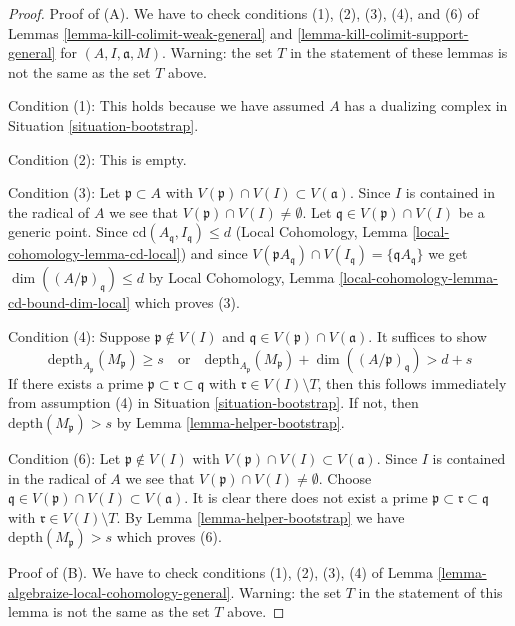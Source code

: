 \begin{proof}
\medskip\noindent
Proof of (A). We have to check conditions (1), (2), (3), (4), and (6)
of Lemmas \ref{lemma-kill-colimit-weak-general} and
\ref{lemma-kill-colimit-support-general} for
$(A, I, \mathfrak a, M)$. Warning: the set $T$ in the statement of
these lemmas is not the same as the set $T$ above.

\medskip\noindent
Condition (1): This holds because we have assumed $A$ has a dualizing complex in
Situation \ref{situation-bootstrap}.

\medskip\noindent
Condition (2): This is empty.

\medskip\noindent
Condition (3): Let $\mathfrak p \subset A$ with
$V(\mathfrak p) \cap V(I) \subset V(\mathfrak a)$.
Since $I$ is contained in the radical of $A$ we see
that $V(\mathfrak p) \cap V(I) \not = \emptyset$.
Let $\mathfrak q \in V(\mathfrak p) \cap V(I)$ be a generic point.
Since $\text{cd}(A_\mathfrak q, I_\mathfrak q) \leq d$
(Local Cohomology, Lemma \ref{local-cohomology-lemma-cd-local}) and since
$V(\mathfrak p A_\mathfrak q) \cap V(I_\mathfrak q) =
\{\mathfrak q A_\mathfrak q\}$ we get
$\dim((A/\mathfrak p)_\mathfrak q) \leq d$ by Local Cohomology,
Lemma \ref{local-cohomology-lemma-cd-bound-dim-local} which proves (3).

\medskip\noindent
Condition (4): Suppose $\mathfrak p \not \in V(I)$ and
$\mathfrak q \in V(\mathfrak p) \cap V(\mathfrak a)$.
It suffices to show
$$
\text{depth}_{A_\mathfrak p}(M_\mathfrak p) \geq s
\quad\text{or}\quad
\text{depth}_{A_\mathfrak p}(M_\mathfrak p) +
\dim((A/\mathfrak p)_\mathfrak q) > d + s
$$
If there exists a prime $\mathfrak p \subset \mathfrak r \subset \mathfrak q$
with $\mathfrak r \in V(I) \setminus T$, then this follows
immediately from assumption (4) in Situation \ref{situation-bootstrap}.
If not, then $\text{depth}(M_\mathfrak p) > s$ by
Lemma \ref{lemma-helper-bootstrap}.

\medskip\noindent
Condition (6): Let $\mathfrak p \not \in V(I)$ with
$V(\mathfrak p) \cap V(I) \subset V(\mathfrak a)$.
Since $I$ is contained in the radical of $A$ we see
that $V(\mathfrak p) \cap V(I) \not = \emptyset$.
Choose $\mathfrak q \in V(\mathfrak p) \cap V(I) \subset V(\mathfrak a)$.
It is clear there does not exist a prime
$\mathfrak p \subset \mathfrak r \subset \mathfrak q$
with $\mathfrak r \in V(I) \setminus T$.
By Lemma \ref{lemma-helper-bootstrap} we have
$\text{depth}(M_\mathfrak p) > s$ which proves (6).

\medskip\noindent
Proof of (B). We have to check conditions (1), (2), (3), (4) of
Lemma \ref{lemma-algebraize-local-cohomology-general}. Warning:
the set $T$ in the statement of
this lemma is not the same as the set $T$ above.


\end{proof}
